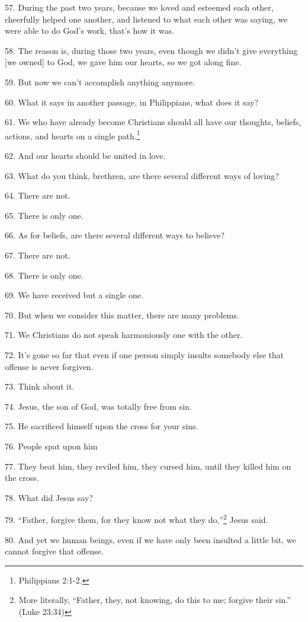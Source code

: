 57. During the past two years, because we loved and esteemed each other, cheerfully
helped one another, and listened to what each other was saying, we were able to
do God's work, that's how it was.

58. The reason is, during those two years, even though we didn't give everything
[we owned] to God, we gave him our hearts, so we got along fine.

59. But now we can't accomplish anything anymore.

60. What it says in another passage, in Philippians, what does it say?

61. We who have already become Christians should all have our thoughts, beliefs,
actions, and hearts on a single path.\footnote{Philippians 2:1-2.}

62. And our hearts should be united in love.

63. What do you think, brethren, are there several different ways of loving?

64. There are not.

65. There is only one.

66. As for beliefs, are there several different ways to believe?

67. There are not.

68. There is only one.

69. We have received but a single one.

70. But when we consider this matter, there are many problems.

71. We Christians do not speak harmoniously one with the other.

72. It's gone so far that even if one person simply insults somebody else that
offense is never forgiven.

73. Think about it.

74. Jesus, the son of God, was totally free from sin.

75. He sacrificed himself upon the cross for your sins.

76. People spat upon him

77. They beat him, they reviled him, they cursed him, until they killed him on
the cross.

78. What did Jesus say?

79. ``Father, forgive them, for they know not what they do,''\footnote{More literally, ``Father, they, not knowing, do this to me; forgive their sin.'' (Luke 23:34)} Jesus said.

80. And yet we human beings, even if we have only been insulted a little bit, we
cannot forgive that offense.


